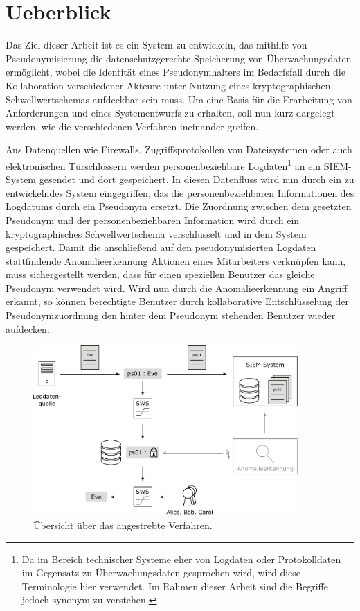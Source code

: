 \chapter{Ueberblick}
\label{cha_overview}

Das Ziel dieser Arbeit ist es ein System zu entwickeln, das mithilfe von Pseudonymisierung die datenschutzgerechte Speicherung von Überwachungsdaten ermöglicht, wobei die Identität eines Pseudonymhalters im Bedarfsfall durch die Kollaboration verschiedener Akteure unter Nutzung eines kryptographischen Schwellwertschemas aufdeckbar sein muss. Um eine Basis für die Erarbeitung von Anforderungen und eines Systementwurfs zu erhalten, soll nun kurz dargelegt werden, wie die verschiedenen Verfahren ineinander greifen. 

Aus Datenquellen wie Firewalls, Zugriffsprotokollen von Dateisystemen oder auch elektronischen Türschlössern werden personenbeziehbare Logdaten\footnote{
  Da im Bereich technischer Systeme eher von Logdaten oder Protokolldaten im Gegensatz zu Überwachungsdaten gesprochen wird, wird diese Terminologie hier verwendet. Im Rahmen dieser Arbeit sind die Begriffe jedoch synonym zu verstehen.
} an ein SIEM-System gesendet und dort gespeichert. In diesen Datenfluss wird nun durch ein zu entwickelndes System eingegriffen, das die personenbeziehbaren Informationen des Logdatums durch ein Pseudonym ersetzt. Die Zuordnung zwischen dem gesetzten Pseudonym und der personenbeziehbaren Information wird durch ein kryptographisches Schwellwertschema verschlüsselt und in dem System gespeichert. Damit die anschließend auf den pseudonymisierten Logdaten stattfindende Anomalieerkennung Aktionen eines Mitarbeiters verknüpfen kann, muss sichergestellt werden, dass für einen speziellen Benutzer das gleiche Pseudonym verwendet wird. Wird nun durch die Anomalieerkennung ein Angriff erkannt, so können berechtigte Benutzer durch kollaborative Entschlüsselung der Pseudonymzuordnung den hinter dem Pseudonym stehenden Benutzer wieder aufdecken.

\begin{figure}[]
    \centering
        \includegraphics[width=0.9\textwidth]{dia/overview.pdf}
    \caption{Übersicht über das angestrebte Verfahren.}
    \label{fig:overview_initial}
\end{figure}

